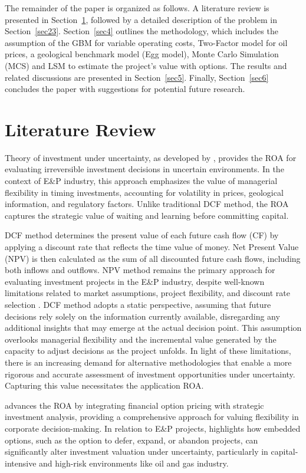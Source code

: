 \documentclass[pdflatex,sn-basic]{sn-jnl}%
\theoremstyle{thmstyleone}%
\theoremstyle{thmstyletwo}%
\theoremstyle{thmstylethree}%
\begin{document}
The remainder of the paper is organized as follows. A literature review is presented in Section~\ref{sec2}, followed by a detailed description of the problem in Section~\ref{sec23}. Section~\ref{sec4} outlines the methodology, which includes the assumption of the GBM for variable operating costs, Two-Factor model for oil prices, a geological benchmark model (Egg model), Monte Carlo Simulation (MCS) and LSM to estimate the project's value with options. The results and related discussions are presented in Section~\ref{sec5}. Finally, Section~\ref{sec6} concludes the paper with suggestions for potential future research.

\section{Literature Review}\label{sec2}

Theory of investment under uncertainty, as developed by \cite{ref1}, provides the ROA for evaluating irreversible investment decisions in uncertain environments. In the context of E\&P industry, this approach emphasizes the value of managerial flexibility in timing investments, accounting for volatility in prices, geological information, and regulatory factors. Unlike traditional DCF method, the ROA captures the strategic value of waiting and learning before committing capital.

DCF method determines the present value of each future cash flow (CF) by applying a discount rate that reflects the time value of money. Net Present Value (NPV) is then calculated as the sum of all discounted future cash flows, including both inflows and outflows. NPV method remains the primary approach for evaluating investment projects in the E\&P industry, despite well-known limitations related to market assumptions, project flexibility, and discount rate selection \citep{ref1a}. DCF method adopts a static perspective, assuming that future decisions rely solely on the information currently available, disregarding any additional insights that may emerge at the actual decision point. This assumption overlooks managerial flexibility and the incremental value generated by the capacity to adjust decisions as the project unfolds. In light of these limitations, there is an increasing demand for alternative methodologies that enable a more rigorous and accurate assessment of investment opportunities under uncertainty. Capturing this value necessitates the application ROA.

\cite{ref2} advances the ROA by integrating financial option pricing with strategic investment analysis, providing a comprehensive approach for valuing flexibility in corporate decision-making. In relation to E\&P projects, \cite{ref2} highlights how embedded options, such as the option to defer, expand, or abandon projects, can significantly alter investment valuation under uncertainty, particularly in capital-intensive and high-risk environments like oil and gas industry.
\end{document}
